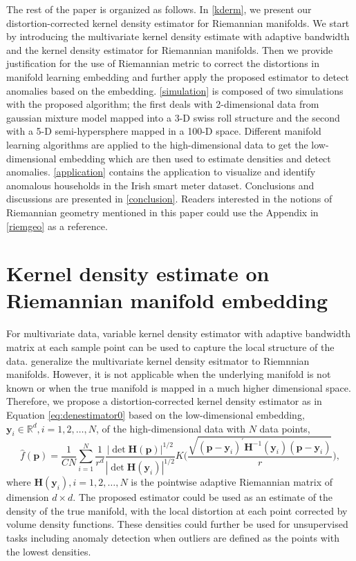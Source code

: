 \documentclass[11pt,a4paper,]{article}
\begin{document}
The rest of the paper is organized as follows. In \autoref{kderm}, we present our distortion-corrected kernel density estimator for Riemannian manifolds. We start by introducing the multivariate kernel density estimate with adaptive bandwidth and the kernel density estimator for Riemannian manifolds. Then we provide justification for the use of Riemannian metric to correct the distortions in manifold learning embedding and further apply the proposed estimator to detect anomalies based on the embedding. \autoref{simulation} is composed of two simulations with the proposed algorithm; the first deals with 2-dimensional data from gaussian mixture model mapped into a 3-D swiss roll structure and the second with a 5-D semi-hypersphere mapped in a 100-D space. Different manifold learning algorithms are applied to the high-dimensional data to get the low-dimensional embedding which are then used to estimate densities and detect anomalies.
\autoref{application} contains the application to visualize and identify anomalous households in the Irish smart meter dataset. Conclusions and discussions are presented in \autoref{conclusion}. Readers interested in the notions of Riemannian geometry mentioned in this paper could use the Appendix in \autoref{riemgeo} as a reference.

\hypertarget{kderm}{%
\section{Kernel density estimate on Riemannian manifold embedding}\label{kderm}}

For multivariate data, variable kernel density estimator with adaptive bandwidth matrix at each sample point can be used to capture the local structure of the data. \textcite{Pelletier2005-vu} generalize the multivariate kernel density esitmator to Riemnnian manifolds. However, it is not applicable when the underlying manifold is not known or when the true manifold is mapped in a much higher dimensional space. Therefore, we propose a distortion-corrected kernel density estimator as in Equation \eqref{eq:denestimator0} based on the low-dimensional embedding, \(\pmb{y}_i \in \mathbb{R}^d, i = 1, 2, \dots, N\), of the high-dimensional data with \(N\) data points,
\begin{equation}
\label{eq:denestimator0}
\hat{f}(\pmb{p}) = \frac{1}{CN} \sum_{i=1}^{N} \frac{1}{r^d} \frac{|\det \pmb{H}(\pmb{p})|^{1/2}}{|\det \pmb{H}(\pmb{y}_i)|^{1/2}} K\bigg( \frac{ \sqrt{(\pmb{p} - \pmb{y}_i)^\prime \pmb{H}^{-1}(\pmb{y}_i) (\pmb{p} - \pmb{y}_i)} }{r} \bigg),
\end{equation}
where \(\pmb{H}(\pmb{y}_i), i = 1, 2, \dots, N\) is the pointwise adaptive Riemannian matrix of dimension \(d \times d\).
The proposed estimator could be used as an estimate of the density of the true manifold, with the local distortion at each point corrected by volume density functions. These densities could further be used for unsupervised tasks including anomaly detection when outliers are defined as the points with the lowest densities.
\end{document}
